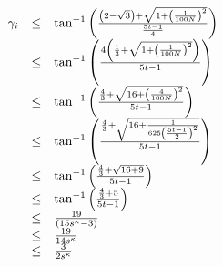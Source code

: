 \begin{equation}\label{eqn:gammaBound}
\begin{array}{rcl}
\gamma_i &\leq & \tan^{-1} \left( 
								\frac{
										\left( 2 - \sqrt{3} \right) + \sqrt{1+ \left( 	\frac{1}{100N}	 \right)^2}
								}{
										\frac{5t-1}{4}
								}	
							 \right)\\
&\leq & \tan^{-1} \left( 
								\frac{
										4 \left(  \frac{1}{3} + \sqrt{1+ \left( 	\frac{1}{100N}	 \right)^2}  \right)
								}{
										5t-1
								}	
							 \right)\\
&\leq & \tan^{-1} \left( 
								\frac{
										\frac{4}{3} + \sqrt{16+ \left( 	\frac{4}{100N}	 \right)^2} 
								}{
										5t-1
								}	
							 \right)\\
&\leq & \tan^{-1} \left( 
								\frac{
										\frac{4}{3} + \sqrt{16+ 	\frac{1}{625 \left( \frac{5t-1}{2} \right)^2}} 
								}{
										5t-1
								}	
							 \right)\\
&\leq & \tan^{-1} \left( 
								\frac{
										\frac{4}{3} + \sqrt{16+ 9} 
								}{
										5t-1
								}	
							 \right)\\
&\leq & \tan^{-1} \left( 
								\frac{
										\frac{4}{3} + 5
								}{
										5t-1
								}	
							 \right)\\
&\leq&\frac{
					19
			}{
					 \left( 15s^\kappa-3 \right)
			}\\
&\leq&\frac{
					19
			}{
					 14s^\kappa
			}\\
			&\leq&\frac{
					3
			}{
					 2s^\kappa
			}
\end{array}
\end{equation}
